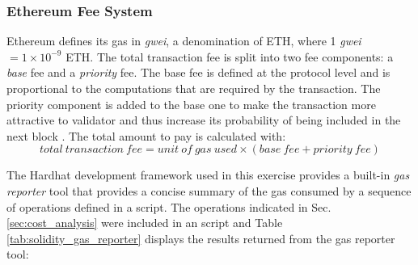 \documentclass[../main.tex]{subfiles}
\begin{document}
\subsubsection{Ethereum Fee System}
Ethereum defines its gas in \textit{gwei}, a denomination of ETH, where 1 \textit{gwei} $ = 1 \times 10^{-9} $ ETH. The total transaction fee is split into two fee components: a \textit{base} fee and a \textit{priority} fee. The base fee is defined at the protocol level and is proportional to the computations that are required by the transaction. The priority component is added to the base one to make the transaction more attractive to validator and thus increase its probability of being included in the next block \cite{ethereum2024c}. The total amount to pay is calculated with:
$$
    total\: transaction\: fee = unit\: of\: gas\: used \times ( base\: fee + priority\: fee)
$$

The Hardhat development framework used in this exercise provides a built-in \textit{gas reporter} tool that provides a concise summary of the gas consumed by a sequence of operations defined in a script. The operations indicated in Sec. \ref{sec:cost_analysis} were included in an script and Table \ref{tab:solidity_gas_reporter} displays the results returned from the gas reporter tool:
\end{document}
